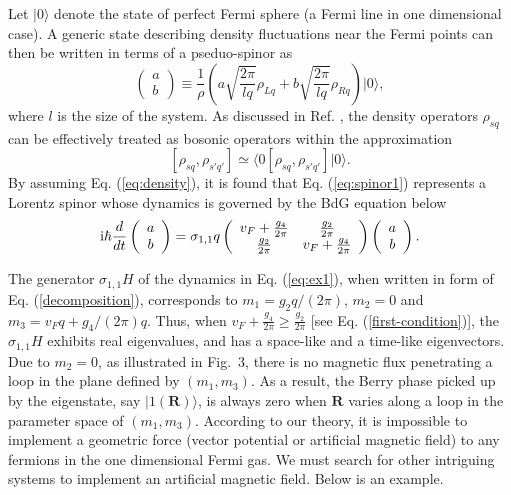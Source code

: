 \documentclass[pra,epsfig,rotate,superscriptaddress,showpacs]{revtex4}
\begin{document}
Let $|0\rangle$ denote the state of perfect Fermi sphere (a Fermi line in one dimensional case). A generic state describing density fluctuations near the Fermi points can then be written in terms of a pseduo-spinor as
\begin{equation}\label{eq:spinor1}
\left(\begin{array}{c}a \\b\end{array} \right)\equiv\frac{1}{\rho}\left(a \sqrt{\frac{2\pi}{lq}}\rho_{Lq}+b\sqrt{\frac{2\pi}{lq}} \rho_{Rq}\right)|0\rangle,
\end{equation}
where $l$ is the size of the system. As discussed in Ref. \cite{fergas}, the density operators $\rho_{sq}$ can be effectively treated as bosonic operators within the approximation
\begin{equation}\label{eq:density}
[\rho_{sq},\rho_{s'q'}]\simeq\langle 0 [\rho_{sq},\rho_{s'q'}] |0\rangle.
\end{equation}
By assuming Eq. (\ref{eq:density}), it is found that Eq. (\ref{eq:spinor1}) represents a Lorentz spinor whose dynamics is governed by the BdG equation below
\begin{equation}\label{eq:ex1}
{\text i}\hbar\frac{d}{dt}\left(\begin{array}{c}a \\b\end{array} \right)=\sigma_{1,1} q \left(\begin{array}{cc}v_F+\frac{g_4}{2\pi}&\frac{g_2}{2\pi} \\ \frac{g_2}{2\pi}&v_F+\frac{g_4}{2\pi}\end{array} \right) \left(\begin{array}{c}a \\b\end{array} \right).
\end{equation}

The generator $\sigma_{1,1}H$ of the dynamics in Eq. (\ref{eq:ex1}), when written in form of Eq. (\ref{decomposition}), corresponds to $m_1=g_2q/(2\pi)$, $m_2=0$ and $m_3=v_F q+g_4/(2\pi)q$. Thus, when $v_F+\frac{g_4}{2\pi}\geq\frac{g_2}{2\pi}$ [see Eq. (\ref{first-condition})], the $\sigma_{1,1}H$ exhibits real eigenvalues, and has a space-like and a time-like eigenvectors. Due to $m_2=0$, as illustrated in Fig.~3, there is no magnetic flux penetrating a loop in the plane defined by $(m_1,m_3)$. As a result, the Berry phase picked up by the eigenstate, say $|1(\mathbf{R})\rangle$, is always zero when $\mathbf{R}$ varies along a loop in the parameter space of $(m_1,m_3)$. According to our theory, it is impossible to implement a geometric force (vector potential or artificial magnetic field) to any fermions in the one dimensional Fermi gas. We must search for other intriguing systems to implement an artificial magnetic field. Below is an example.
\end{document}
